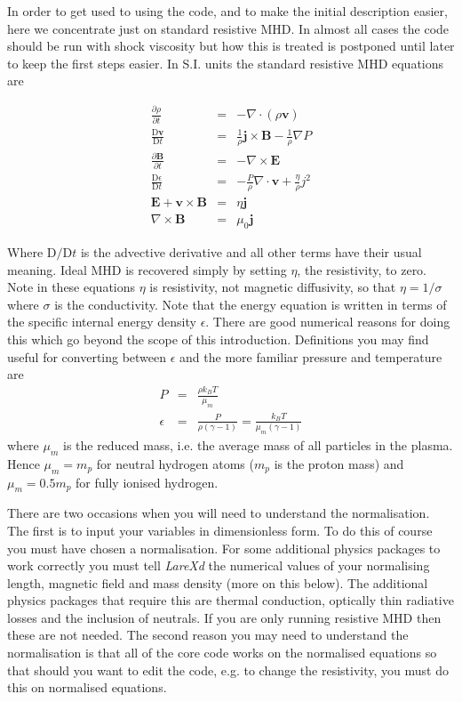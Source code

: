 \documentclass[11pt]{article}
\begin{document}
In order to get used to using the code, and to make the initial description easier, here we concentrate 
just on standard resistive MHD. In almost all cases the code should be run with shock viscosity
but how this is treated is postponed until later to keep the first steps easier. In S.I. units the 
standard resistive MHD equations are

\begin{eqnarray}
\frac{\partial \rho}{\partial t}&=&- \nabla\cdot(\rho \mathbf{v})\\
\frac{\mathrm{D}\mathbf{v}}{\mathrm{D}t}&=&\frac{1}{\rho}\mathbf{j}\times\mathbf{B}
-\frac{1}{\rho}\nabla P\\
\frac{\partial \mathbf{B}}{\partial t}&=&-\nabla\times\mathbf{E} \label{faraday}\\
\frac{\mathrm{D}\epsilon}{\mathrm{D}t}&=&-\frac{P}{\rho}\nabla\cdot\mathbf{v}+\frac
{\eta}{\rho}j^{2}\\
\mathbf{E}+\mathbf{v}\times\mathbf{B}&=&\eta \mathbf{j} \label{ohm}\\
\nabla\times\mathbf{B}&=&\mu_0 \mathbf{j}
\end{eqnarray}

Where $\mathrm{D}/\mathrm{D}t$ is the advective derivative and all other terms have their usual 
meaning. Ideal MHD is recovered simply by setting $\eta$, the resistivity, to zero. Note in these 
equations $\eta$ is resistivity, not magnetic diffusivity, so that $\eta=1/\sigma$ where $\sigma$ is 
the conductivity. Note that the energy equation is written in terms of the specific internal energy 
density $\epsilon$. There are good numerical reasons for doing this which go beyond the scope of this 
introduction. Definitions you may find useful for converting between $\epsilon$ and the more familiar 
pressure and temperature are
\begin{eqnarray*}
P&=&\frac{\rho k_{B}T}{\mu_m}\\
\epsilon&=&\frac{P}{\rho(\gamma-1)}=\frac{k_B T}{\mu_m (\gamma-1)}
\end{eqnarray*}
where $\mu_m$ is the reduced mass, i.e. the average mass of all particles in the plasma. 
Hence $\mu_m=m_p$ for neutral hydrogen atoms ($m_p$ is the proton mass) and $\mu_m=0.5 m_p$ for fully 
ionised hydrogen.

There are two occasions when you will need to understand the normalisation. The first is to input your 
variables in dimensionless form. To do this of course you must have chosen a normalisation. For some 
additional physics packages to work correctly you must tell {\it LareXd} the numerical values of your 
normalising length, magnetic field and mass density (more on this below). The additional physics packages 
that require this are thermal conduction, optically thin radiative losses and the inclusion of neutrals. 
If you are only running resistive MHD then these are not needed. The second reason you may need to 
understand the normalisation is that all of the core code works on the normalised equations so that 
should you want to edit the code, e.g. to change the resistivity, you must do this on normalised equations.
\end{document}
